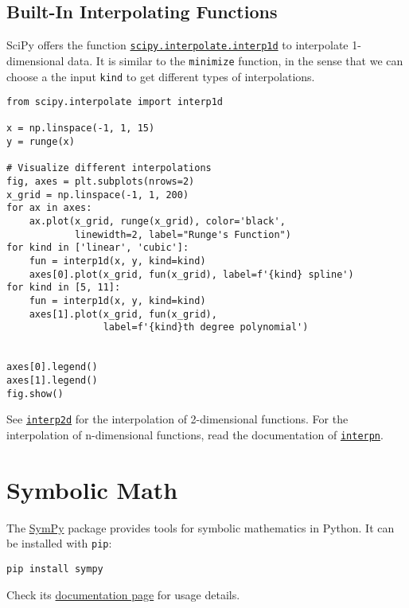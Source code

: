 \documentclass[12pt, a4paper]{article}
\begin{document}
\subsection{Built-In Interpolating Functions}
\label{sec:org0eeb3b3}
SciPy offers the function \href{https://docs.scipy.org/doc/scipy/reference/generated/scipy.interpolate.interp1d.html\#scipy-interpolate-interp1d}{\texttt{scipy.interpolate.interp1d}} to interpolate 1-dimensional data.
It is similar to the \texttt{minimize} function, in the sense that we can choose a the input \texttt{kind} to get different types of interpolations.
\lstset{language=jupyter-python,label= ,caption= ,captionpos=b,numbers=none}
\begin{lstlisting}
from scipy.interpolate import interp1d

x = np.linspace(-1, 1, 15)
y = runge(x)

# Visualize different interpolations
fig, axes = plt.subplots(nrows=2)
x_grid = np.linspace(-1, 1, 200)
for ax in axes:
    ax.plot(x_grid, runge(x_grid), color='black',
            linewidth=2, label="Runge's Function")
for kind in ['linear', 'cubic']:
    fun = interp1d(x, y, kind=kind)
    axes[0].plot(x_grid, fun(x_grid), label=f'{kind} spline')
for kind in [5, 11]:
    fun = interp1d(x, y, kind=kind)
    axes[1].plot(x_grid, fun(x_grid),
                 label=f'{kind}th degree polynomial')


axes[0].legend()
axes[1].legend()
fig.show()
\end{lstlisting}

See \href{https://docs.scipy.org/doc/scipy/reference/generated/scipy.interpolate.interp2d.html\#scipy.interpolate.interp2d}{\texttt{interp2d}} for the interpolation of 2-dimensional functions.
For the interpolation of n-dimensional functions, read the documentation of \href{https://docs.scipy.org/doc/scipy/reference/generated/scipy.interpolate.interpn.html\#scipy.interpolate.interpn}{\texttt{interpn}}.
\section{Symbolic Math}
\label{sec:org3ca86f3}
The \href{https://www.sympy.org/en/index.html}{SymPy} package provides tools for symbolic mathematics in Python.
It can be installed with \texttt{pip}:
\lstset{language=bash,label= ,caption= ,captionpos=b,firstnumber=1,numbers=left,style=bash}
\begin{lstlisting}
pip install sympy
\end{lstlisting}
Check its \href{https://docs.sympy.org/latest/index.html}{documentation page} for usage details.
\end{document}
